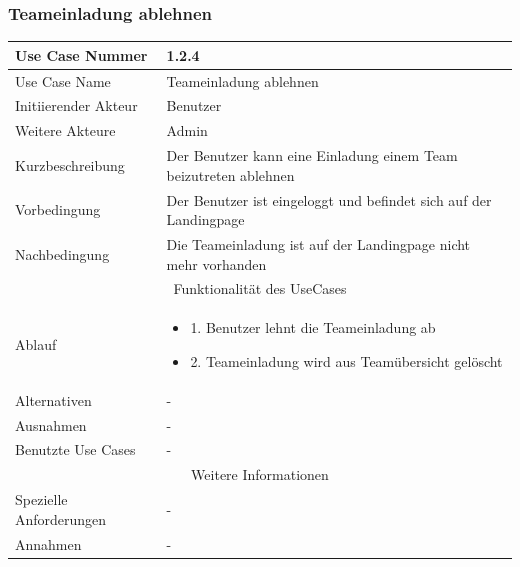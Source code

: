 \documentclass[10pt,a4paper]{article}
\begin{document}
		\subsubsection{Teameinladung ablehnen}
		\begin{tabular}{|l|p{.5\linewidth}|}
			\hline Use Case Nummer & 1.2.4 \\ 
			\hline Use Case Name & Teameinladung ablehnen \\ 
			\hline Initiierender Akteur & Benutzer \\
			\hline Weitere Akteure & Admin \\
			\hline Kurzbeschreibung & Der Benutzer kann eine Einladung einem Team beizutreten ablehnen \\
			\hline Vorbedingung & Der Benutzer ist eingeloggt und befindet sich auf der Landingpage \\
			\hline Nachbedingung & Die Teameinladung ist auf der Landingpage nicht mehr vorhanden \\
			\hline \multicolumn{2}{|c|}{Funktionalität des UseCases}\\
			\hline Ablauf & \begin{itemize}
				\item 1. Benutzer lehnt die Teameinladung ab
				\item 2. Teameinladung wird aus Teamübersicht gelöscht
			\end{itemize} \\
			\hline Alternativen & - \\
			\hline Ausnahmen & - \\
			\hline Benutzte Use Cases & - \\
			\hline \multicolumn{2}{|c|}{Weitere Informationen} \\
			\hline Spezielle Anforderungen & - \\
			\hline Annahmen & - \\
			\hline
		\end{tabular}
				
\end{document}
